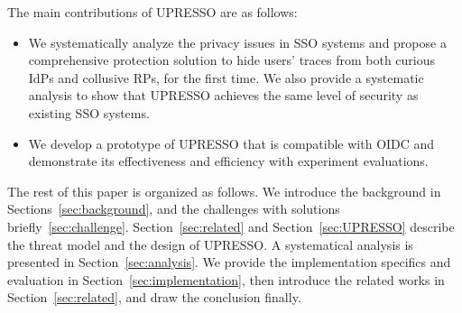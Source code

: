 The main contributions of UPRESSO are as follows:
\begin{itemize}
\item We systematically analyze the privacy issues in SSO systems and propose a comprehensive protection solution to hide users' traces from both curious IdPs and collusive RPs, for the first time. We also provide a systematic analysis to show that UPRESSO achieves the same level of security as existing SSO systems.
\item We develop a prototype of UPRESSO that is compatible with OIDC and demonstrate its effectiveness and efficiency with experiment evaluations.
\end{itemize}



The rest of this paper is organized as follows. We introduce the background in Sections~\ref{sec:background}, and the challenges with solutions briefly~\ref{sec:challenge}. Section~\ref{sec:related} and Section~\ref{sec:UPRESSO} describe the threat model and the design of UPRESSO. A systematical analysis is presented in Section~\ref{sec:analysis}. We provide the implementation specifics and evaluation in Section~\ref{sec:implementation}, then introduce the related works in Section~\ref{sec:related}, and draw the conclusion finally.

